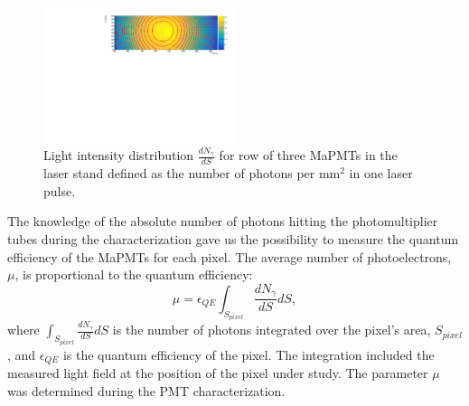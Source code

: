 \begin{figure}[h]
\centering
\includegraphics[width=0.5\textwidth]{figures/photon_flux.pdf}
\caption{Light intensity distribution $\frac {dN_\gamma}{dS}$ for row of three MaPMTs in the laser stand defined as the number of photons per mm$^2$ in  one laser pulse.}
\label{fig:light_flux}
\end{figure}

The knowledge of the absolute number of photons hitting the photomultiplier tubes during the characterization gave us the possibility to measure the quantum efficiency of the MaPMTs for each pixel. The average number of photoelectrons, $\mu$, is proportional to the quantum efficiency:
$$
\mu=\epsilon_{QE} \int_{S_{pixel}}\frac {dN_\gamma}{dS} dS,
$$
\noindent
where $\int_{S_{pixel}}\frac {dN_\gamma}{dS} dS$ is the number of photons integrated over the pixel's area, $S_{pixel}$, and $\epsilon_{QE}$ is the quantum efficiency of the pixel.
The integration included the measured light field at the position of the pixel under study.
The parameter $\mu$ was determined during the PMT characterization.